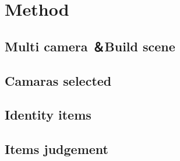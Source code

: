 \section{Method}

\subsection{Multi camera ＆Build scene}

\subsection{Camaras selected}

\subsection{Identity items}

\subsection{Items judgement}
